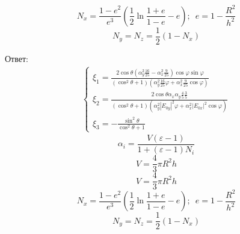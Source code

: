\documentclass[12pt]{article}
\begin{document}
\begin{large}
\[\]
\[
    N_x = \frac{1-e^2}{e^3}\left( \frac{1}{2} \ln \frac{1+e}{1-e} - e \right) ; \, \, \, e = 1 - \frac{R^2}{h^2}
\]
\[
    N_y = N_z = \frac{1}{2} \left( 1 - N_x \right)
\]
\par Ответ:
\begin{eqnarray*}
    \begin{cases}
        \xi_1 = \frac{2 \cos \theta \left( \alpha_y^2 \frac{16}{25} - \alpha_x^2 \frac{9}{25} \right) \cos \varphi \sin \varphi}{\left( \cos^2 \theta + 1 \right)\left( \alpha_y^2 \frac{16}{25} \varphi + \alpha_x^2 \frac{9}{25} \cos \varphi \right)} \\
        \xi_2 = \frac{2 \cos \theta \alpha_x \alpha_y \frac{4}{5} \frac{3}{5}}{\left( \cos^2 \theta + 1 \right)\left( \alpha_y^2 |E_{0y}|^2 \varphi + \alpha_x^2 |E_{0x}|^2 \cos \varphi \right)} \\
        \xi_3 = - \frac{\sin^2 \theta}{\cos^2 \theta + 1}
    \end{cases}
\end{eqnarray*}
\[
    \alpha_i = \frac{V \left( \varepsilon - 1 \right)}{1 + \left( \varepsilon - 1 \right) N_i}
\]
\[
    V = \frac{4}{3}\pi R^2 h
\]
\[
    V = \frac{4}{3}\pi R^2 h
\]
\[
    N_x = \frac{1-e^2}{e^3}\left( \frac{1}{2} \ln \frac{1+e}{1-e} - e \right) ; \, \, \, e = 1 - \frac{R^2}{h^2}
\]
\[
    N_y = N_z = \frac{1}{2} \left( 1 - N_x \right)
\]
\par
\par
\end{large}
\end{document}
